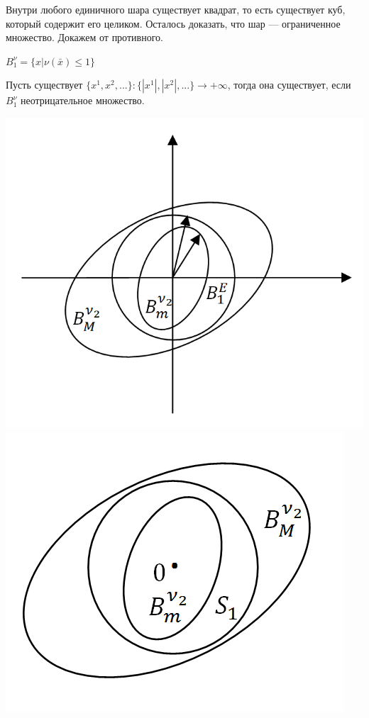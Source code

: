 \documentclass[12pt]{article}
\theoremstyle{definition}
\numberwithin{equation}{section}
\begin{document}
Внутри любого единичного шара существует квадрат, то есть существует куб, который содержит его целиком. Осталось доказать, что шар --- ограниченное множество. Докажем от противного.\begin{center}
$B_1^{\nu} = \{x | \nu(\bar x) \leqslant 1\}$\end{center}
Пусть существует $\{x^1, x^2,...\}: \{|x^1|, |x^2|,...\} \rightarrow +\infty$, тогда она существует, если $B_1^{\nu}$ неотрицательное множество.\begin{center}
\includegraphics[scale=0.55]{l5_7.png}
\includegraphics[scale=0.55]{l5_9.png}

\end{center}
\end{document}
